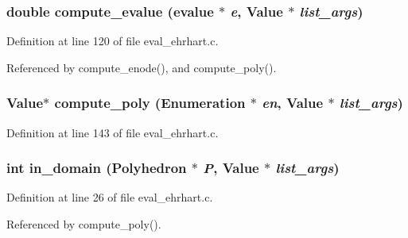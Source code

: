 \subsubsection{\setlength{\rightskip}{0pt plus 5cm}double compute\_\-evalue (evalue $\ast$ {\em e}, Value $\ast$ {\em list\_\-args})}\label{eval__ehrhart_8c_a2}




Definition at line 120 of file eval\_\-ehrhart.c.

Referenced by compute\_\-enode(), and compute\_\-poly().

\subsubsection{\setlength{\rightskip}{0pt plus 5cm}Value$\ast$ compute\_\-poly (Enumeration $\ast$ {\em en}, Value $\ast$ {\em list\_\-args})}\label{eval__ehrhart_8c_a3}




Definition at line 143 of file eval\_\-ehrhart.c.
\subsubsection{\setlength{\rightskip}{0pt plus 5cm}int in\_\-domain (Polyhedron $\ast$ {\em P}, Value $\ast$ {\em list\_\-args})}\label{eval__ehrhart_8c_a0}




Definition at line 26 of file eval\_\-ehrhart.c.

Referenced by compute\_\-poly().

